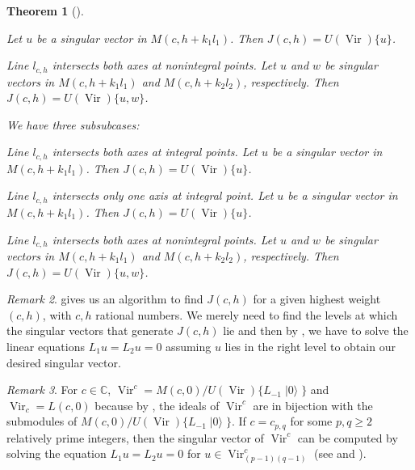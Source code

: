 \documentclass[a4paper, 12pt, reqno]{amsart}
\newtheorem{theorem}{Theorem}[section]
\theoremstyle{remark}
\newtheorem{remark}[theorem]{Remark}
\numberwithin{equation}{subsection}
\DeclareMathOperator{\Vir}{Vir}
\DeclareMathOperator{\vac}{|0\rangle}
\begin{document}
\begin{theorem}[{\cite{astashkevich_structure_1997}}]
\begin{description}[leftmargin = !]
\begin{description}[leftmargin = !]
\begin{description}[leftmargin = !]
        Let $u$ be a singular vector in $M(c, h + k_1l_1)$.
        Then $J(c, h) = U(\Vir)\{u\}$.
      \item[Subsubcase III$_-$] Line $l_{c, h}$ intersects both axes at nonintegral points.
        Let $u$ and $w$ be singular vectors in $M(c, h + k_1l_1)$ and $M(c, h + k_2l_2)$, respectively.
        Then $J(c, h) = U(\Vir)\{u, w\}$.
      \end{description}
    \item[Subcase $c \ge 25$] We have three subsubcases:
      \begin{description}[leftmargin = !]
      \item[Subsubcase III$^{00}_+$] Line $l_{c, h}$ intersects both axes at integral points.
        Let $u$ be a singular vector in $M(c, h + k_1l_1)$.
        Then $J(c, h) = U(\Vir)\{u\}$.
      \item[Subsubcase III$^0_+$] Line $l_{c, h}$ intersects only one axis at integral point.
        Let $u$ be a singular vector in $M(c, h + k_1l_1)$.
        Then $J(c, h) = U(\Vir)\{u\}$.
      \item[Subsubcase III$_+$] Line $l_{c, h}$ intersects both axes at nonintegral points.
        Let $u$ and $w$ be singular vectors in $M(c, h + k_1l_1)$ and $M(c, h + k_2l_2)$, respectively.
        Then $J(c, h) = U(\Vir)\{u, w\}$.
      \end{description}
    \end{description}
  \end{description}
\end{theorem}

\begin{remark}
  \label{rmk:28}
   gives us an algorithm to find $J(c, h)$ for a given highest weight $(c, h)$, with $c, h$ rational numbers.
  We merely need to find the levels at which the singular vectors that generate $J(c, h)$ lie and then by , we have to solve the linear equations $L_1u = L_2 u = 0$ assuming $u$ lies in the right level to obtain our desired singular vector.
\end{remark}

\begin{remark}
  \label{rmk:29}
  For $c \in \mathbb{C}$, $\Vir^c = M(c, 0)/U(\Vir)\{L_{-1}\vac\}$ and $\Vir_c = L(c, 0)$ because by , the ideals of $\Vir^c$ are in bijection with the submodules of $M(c, 0)/U(\Vir)\{L_{-1}\vac\}$.
  If $c = c_{p, q}$ for some $p, q \ge 2$ relatively prime integers, then the singular vector of $\Vir^c$ can be computed by solving the equation $L_1u = L_2u = 0$ for $u \in \Vir^c_{(p - 1)(q - 1)}$ (see  and ).
\end{remark}
\end{document}

